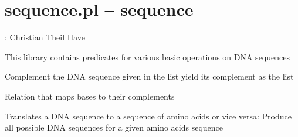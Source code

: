 


\section{sequence.pl -- sequence}

\label{sec:sequence}

\begin{tags}
: Christian Theil Have

This library contains predicates for various basic operations on DNA sequences
\end{tags}

\vspace{0.7cm}

\begin{description}
Complement the DNA sequence given in the list  yield its complement as the list 

Relation that maps bases to their complements

Translates a DNA sequence to a sequence of amino acids
or vice versa: Produce all possible DNA sequences for
a given amino acids sequence
\end{description}

